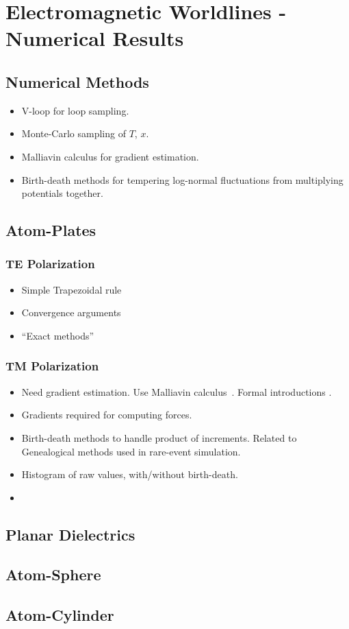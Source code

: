 \chapter{Electromagnetic Worldlines - Numerical Results}

\section{Numerical Methods}

\begin{itemize}
  \item V-loop for loop sampling.
  \item Monte-Carlo sampling of $T$, $x$.  
  \item Malliavin calculus for gradient estimation.
  \item Birth-death methods for tempering log-normal fluctuations from multiplying potentials
    together.  
\end{itemize}


    \section{ Atom-Plates}
    
    \subsection{TE Polarization}
    \begin{itemize}
      \item Simple Trapezoidal rule
      \item Convergence arguments
      \item ``Exact methods''
    \end{itemize}
    
    \subsection{TM Polarization}

    \begin{itemize}
      \item Need gradient estimation.  Use Malliavin calculus~\cite{Fournie1999, Chen2007,Kohatsu-Higa2003}.
        Formal introductions \cite{Nualart2006, Malliavin2006, DiNunno2009}.
      \item Gradients required for computing forces.  
      \item Birth-death methods to handle product of increments.  Related to Genealogical 
        methods used in rare-event simulation.  
      \item Histogram of raw values, with/without birth-death.
      \item 
    \end{itemize}
    



    \section{Planar Dielectrics}
    \section{Atom-Sphere}
    \section{Atom-Cylinder}


